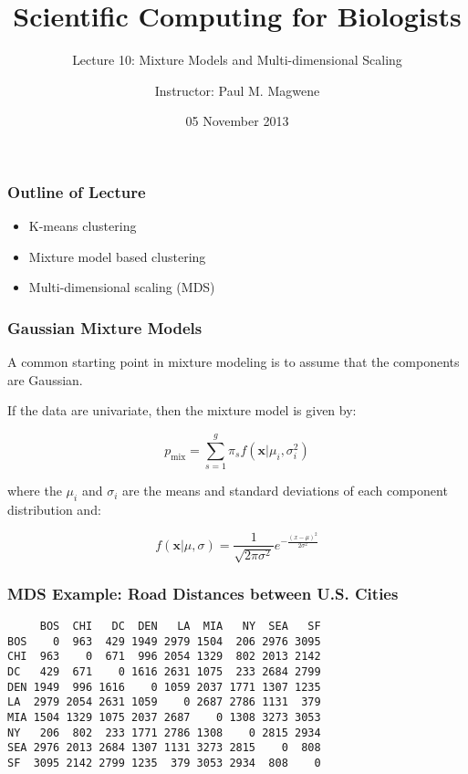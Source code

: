 \documentclass[svgnames]{beamer}
\title{Scientific Computing for Biologists}
\subtitle{Lecture 10: Mixture Models and Multi-dimensional Scaling} %
\author{Instructor: Paul M. Magwene}
\date{05 November 2013}
\newcommand{\Mtx}[1]{\ensuremath{\mathbf{#1}}}
\begin{document}
\begin{frame}
\titlepage
\end{frame}

\begin{frame}
  \frametitle{Outline of Lecture}

\begin{itemize}
    \item K-means clustering
    \item Mixture model based clustering
    \item Multi-dimensional scaling (MDS)
\end{itemize}

\end{frame}
\begin{frame}
  \frametitle{Gaussian Mixture Models}

A common starting point in mixture modeling is to assume that the components are Gaussian.

If the data are univariate, then the mixture model is given by:

\[
p_{\mathrm{mix}} = \sum_{s=1}^g \pi_s f(\Mtx{x}|\mu_i, \sigma_i^2)
\]

where the $\mu_i$ and $\sigma_i$ are the means and standard deviations of each component distribution and:

\[
f(\Mtx{x}|\mu, \sigma) = \frac{1}{\sqrt{2\pi\sigma^2}}e^{-\frac{(x-\mu)^2}{2\sigma^2}}
\]

\end{frame}

\begin{frame}[fragile]
  \frametitle{MDS Example: Road Distances between U.S. Cities}

\begin{center}
\begin{verbatim}
     BOS  CHI   DC  DEN   LA  MIA   NY  SEA   SF
BOS    0  963  429 1949 2979 1504  206 2976 3095
CHI  963    0  671  996 2054 1329  802 2013 2142
DC   429  671    0 1616 2631 1075  233 2684 2799
DEN 1949  996 1616    0 1059 2037 1771 1307 1235
LA  2979 2054 2631 1059    0 2687 2786 1131  379
MIA 1504 1329 1075 2037 2687    0 1308 3273 3053
NY   206  802  233 1771 2786 1308    0 2815 2934
SEA 2976 2013 2684 1307 1131 3273 2815    0  808
SF  3095 2142 2799 1235  379 3053 2934  808    0
\end{verbatim}
\end{center}

\end{frame}
\end{document}
